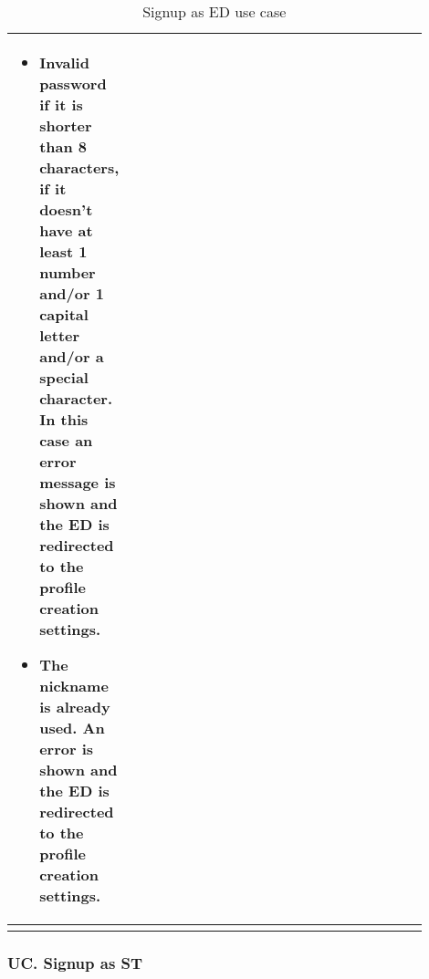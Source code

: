 \begin{center}
\begin{longtable}{|l|p{0.9\linewidth}|}
\begin{itemize}
            \item Invalid password if it is shorter than 8 characters, if it doesn’t have at least 1 number and/or 1 capital letter and/or a special character. In this case an error message is shown and the ED is redirected to the profile creation settings.
            \item  The nickname is already used. An error is shown and the ED is redirected to the profile creation settings.
        \end{itemize}  \\
        \hline
        \caption{Signup as ED use case}
        \label{tab: signup_as_ED_use_case}
    \end{longtable}
\end{center}

\subsubsection*{UC\cuc . Signup as ST}
